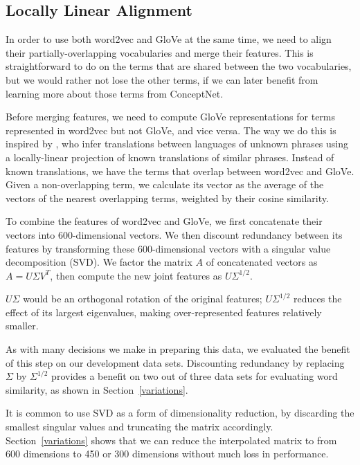 \documentclass[11pt,letterpaper]{article}
\begin{document}
\subsection{Locally Linear Alignment}
\label{locally-linear-alignment}

In order to use both word2vec and GloVe at the same time, we need to align their
partially-overlapping vocabularies and merge their features. This is
straightforward to do on the terms that are shared between the two vocabularies,
but we would rather not lose the other terms, if we can later benefit from
learning more about those terms from ConceptNet.

Before merging features, we need to compute GloVe representations for terms
represented in word2vec but not GloVe, and vice versa. The way we do this
is inspired by , who infer translations between
languages of unknown phrases using a locally-linear projection of known
translations of similar phrases. Instead of known translations, we have the
terms that overlap between word2vec and GloVe. Given a non-overlapping term,
we calculate its vector as the average of the vectors of the nearest
overlapping terms, weighted by their cosine similarity.

To combine the features of word2vec and GloVe, we first concatenate their
vectors into 600-dimensional vectors. We then discount redundancy between its
features by transforming these 600-dimensional vectors with a singular value
decomposition (SVD).  We factor the matrix $A$ of concatenated vectors as $A = U
\Sigma V^T$, then compute the new joint features as $U \Sigma^{1/2}$.

$U \Sigma$ would be an orthogonal rotation of the original features;
$U \Sigma^{1/2}$ reduces the effect of its largest eigenvalues, making
over-represented features relatively smaller.

As with many decisions we make in preparing this data, we evaluated the benefit
of this step on our development data sets.  Discounting redundancy by replacing
$\Sigma$ by $\Sigma^{1/2}$ provides a benefit on two out of three data sets for
evaluating word similarity, as shown in Section~\ref{variations}.

It is common to use SVD as a form of dimensionality reduction, by discarding
the smallest singular values and truncating the matrix accordingly.
Section~\ref{variations} shows that we can reduce the interpolated matrix to
from 600 dimensions to 450 or 300 dimensions without much loss in performance.
\end{document}
